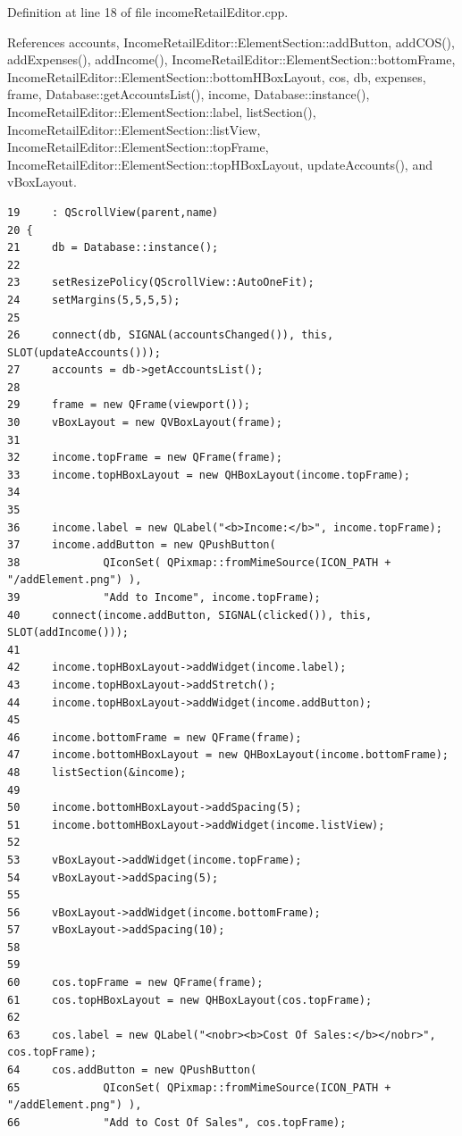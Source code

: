Definition at line 18 of file income\-Retail\-Editor.cpp.

References accounts, Income\-Retail\-Editor::Element\-Section::add\-Button, add\-COS(), add\-Expenses(), add\-Income(), Income\-Retail\-Editor::Element\-Section::bottom\-Frame, Income\-Retail\-Editor::Element\-Section::bottom\-HBox\-Layout, cos, db, expenses, frame, Database::get\-Accounts\-List(), income, Database::instance(), Income\-Retail\-Editor::Element\-Section::label, list\-Section(), Income\-Retail\-Editor::Element\-Section::list\-View, Income\-Retail\-Editor::Element\-Section::top\-Frame, Income\-Retail\-Editor::Element\-Section::top\-HBox\-Layout, update\-Accounts(), and v\-Box\-Layout.

\footnotesize\begin{verbatim}19     : QScrollView(parent,name)
20 {
21     db = Database::instance();
22     
23     setResizePolicy(QScrollView::AutoOneFit);
24     setMargins(5,5,5,5);
25     
26     connect(db, SIGNAL(accountsChanged()), this, SLOT(updateAccounts()));
27     accounts = db->getAccountsList();
28    
29     frame = new QFrame(viewport());
30     vBoxLayout = new QVBoxLayout(frame);
31     
32     income.topFrame = new QFrame(frame);
33     income.topHBoxLayout = new QHBoxLayout(income.topFrame);
34     
35     
36     income.label = new QLabel("<b>Income:</b>", income.topFrame);
37     income.addButton = new QPushButton(
38             QIconSet( QPixmap::fromMimeSource(ICON_PATH + "/addElement.png") ),
39             "Add to Income", income.topFrame);
40     connect(income.addButton, SIGNAL(clicked()), this, SLOT(addIncome()));
41 
42     income.topHBoxLayout->addWidget(income.label);
43     income.topHBoxLayout->addStretch();
44     income.topHBoxLayout->addWidget(income.addButton);
45     
46     income.bottomFrame = new QFrame(frame);
47     income.bottomHBoxLayout = new QHBoxLayout(income.bottomFrame);
48     listSection(&income);
49     
50     income.bottomHBoxLayout->addSpacing(5);
51     income.bottomHBoxLayout->addWidget(income.listView);
52     
53     vBoxLayout->addWidget(income.topFrame);
54     vBoxLayout->addSpacing(5);
55 
56     vBoxLayout->addWidget(income.bottomFrame);
57     vBoxLayout->addSpacing(10);
58    
59 
60     cos.topFrame = new QFrame(frame);
61     cos.topHBoxLayout = new QHBoxLayout(cos.topFrame);
62     
63     cos.label = new QLabel("<nobr><b>Cost Of Sales:</b></nobr>", cos.topFrame);
64     cos.addButton = new QPushButton(
65             QIconSet( QPixmap::fromMimeSource(ICON_PATH + "/addElement.png") ),
66             "Add to Cost Of Sales", cos.topFrame);

\end{verbatim}

